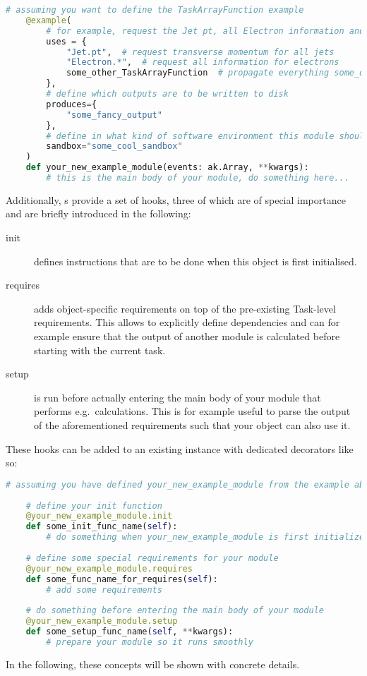 \begin{lstlisting}[language=python]
	# assuming you want to define the TaskArrayFunction example
	@example(
		# for example, request the Jet pt, all Electron information and everything another 
		uses = {
			"Jet.pt",  # request transverse momentum for all jets
			"Electron.*",  # request all information for electrons
			some_other_TaskArrayFunction  # propagate everything some_other_TaskArrayFunction needs to this example TaskArrayFunction
	    },
	    # define which outputs are to be written to disk
	    produces={
	    	"some_fancy_output"
	    },
	    # define in what kind of software environment this module should be run
	    sandbox="some_cool_sandbox"
	)
	def your_new_example_module(events: ak.Array, **kwargs):
	    # this is the main body of your module, do something here...
\end{lstlisting}

Additionally, s provide a set of hooks, three of which are of special importance and are briefly introduced in the following:
\begin{description}
	\item[init] defines instructions that are to be done when this object is first initialised.
	\item[requires] adds object-specific requirements on top of the pre-existing Task-level requirements.
	This allows to explicitly define dependencies and can for example ensure that the output of another module is calculated before starting with the current task.
	\item[setup] is run before actually entering the main body of your module that performs e.g.\ calculations.
	This is for example useful to parse the output of the aforementioned requirements such that your object can also use it.
	
\end{description}

These hooks can be added to an existing   instance with dedicated decorators like so:

\begin{lstlisting}[language=python]
	# assuming you have defined your_new_example_module from the example above
	
	# define your init function
	@your_new_example_module.init
	def some_init_func_name(self):
	    # do something when your_new_example_module is first initialized
	    
	# define some special requirements for your module
	@your_new_example_module.requires
	def some_func_name_for_requires(self):
	    # add some requirements
	
	# do something before entering the main body of your module
	@your_new_example_module.setup
	def some_setup_func_name(self, **kwargs):
	    # prepare your module so it runs smoothly
\end{lstlisting}

In the following, these concepts will be shown with concrete details.

